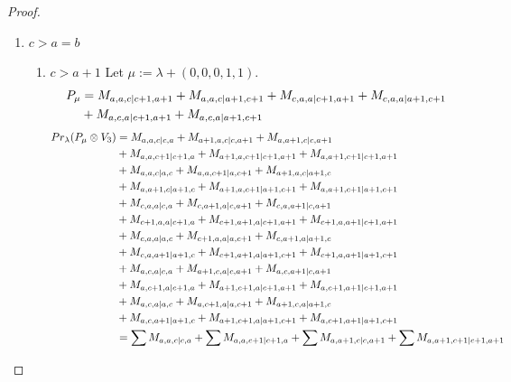 \begin{proof}
\begin{enumerate}
  \item $c>a=b$ 
    \begin{enumerate}
      \item $c>a+1$ 
        Let $\mu:=\lambda + (0,0,0,1,1) $.
        \begin{equation}\notag
          \begin{aligned}
            P_\mu &= M_{a,a,c|c+1,a+1}
+ M_{a,a,c|a+1,c+1}
+ M_{c,a,a|c+1,a+1}
+ M_{c,a,a|a+1,c+1}\\
                                              &
+ M_{a,c,a|c+1,a+1}
+ M_{a,c,a|a+1,c+1}
          \end{aligned}
        \end{equation}
        \begin{equation}\notag
          \begin{aligned}
            Pr_{\lambda}(P_\mu \otimes V_{3}) &=
M_{a,a,c|c,a}
+ M_{a+1,a,c|c,a+1}
+ M_{a,a+1,c|c,a+1}\\
                                              &
+ M_{a,a,c+1|c+1,a}
+ M_{a+1,a,c+1|c+1,a+1}
+ M_{a,a+1,c+1|c+1,a+1}\\
                                              &
+ M_{a,a,c|a,c}
+ M_{a,a,c+1|a,c+1}
+ M_{a+1,a,c|a+1,c}\\
                                              &
+ M_{a,a+1,c|a+1,c}
+ M_{a+1,a,c+1|a+1,c+1}
+ M_{a,a+1,c+1|a+1,c+1}\\
                                              &
+ M_{c,a,a|c,a}
+ M_{c,a+1,a|c,a+1}
+ M_{c,a,a+1|c,a+1}\\
                                              &
+ M_{c+1,a,a|c+1,a}
+ M_{c+1,a+1,a|c+1,a+1}
+ M_{c+1,a,a+1|c+1,a+1}\\
                                              &
+ M_{c,a,a|a,c}
+ M_{c+1,a,a|a,c+1}
+ M_{c,a+1,a|a+1,c}\\
                                              &
+ M_{c,a,a+1|a+1,c}
+ M_{c+1,a+1,a|a+1,c+1}
+ M_{c+1,a,a+1|a+1,c+1}\\
                                              &
+ M_{a,c,a|c,a}
+ M_{a+1,c,a|c,a+1}
+ M_{a,c,a+1|c,a+1}\\
                                              &
+ M_{a,c+1,a|c+1,a}
+ M_{a+1,c+1,a|c+1,a+1}
+ M_{a,c+1,a+1|c+1,a+1}\\
                                              &
+ M_{a,c,a|a,c}
+ M_{a,c+1,a|a,c+1}
+ M_{a+1,c,a|a+1,c}\\
                                              &
+ M_{a,c,a+1|a+1,c}
+ M_{a+1,c+1,a|a+1,c+1}
+ M_{a,c+1,a+1|a+1,c+1} \\
                                               &=
\sum M_{a,a,c|c,a}
+ \sum M_{a,a,c+1|c+1,a}
+ \sum M_{a,a+1,c|c,a+1}
+ \sum M_{a,a+1,c+1|c+1,a+1}
          \end{aligned}
        \end{equation}


\end{enumerate}
\end{enumerate}
\end{proof}
